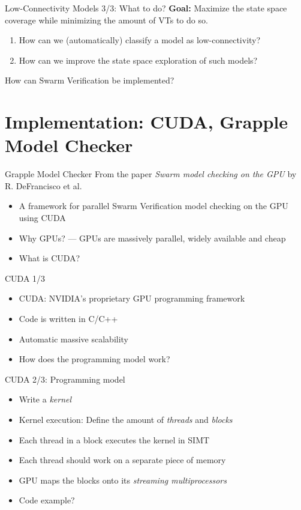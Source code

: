 \documentclass[aspectratio=169]{beamer}
\begin{document}
\begin{frame}{Low-Connectivity Models 3/3: What to do?}
    \textbf{Goal:} Maximize the state space coverage while minimizing the amount of VTs to do so.
    \begin{enumerate}
        \item How can we (automatically) classify a model as low-connectivity?
        \item How can we improve the state space exploration of such models?
    \end{enumerate}

    How can Swarm Verification be implemented?
\end{frame}

\section{Implementation: CUDA, Grapple Model Checker}

\begin{frame}{Grapple Model Checker}
    From the paper \emph{Swarm model checking on the GPU} by R. DeFrancisco et al. \cite{DeFrancisco2020.Grapple}

    \begin{itemize}
        \item A framework for parallel Swarm Verification model checking on the GPU using CUDA
        \item Why GPUs? — GPUs are massively parallel, widely available and cheap
        \item What is CUDA?
    \end{itemize}
\end{frame}

\begin{frame}{CUDA 1/3}
    \begin{itemize}
        \item CUDA: NVIDIA's proprietary GPU programming framework
        \item Code is written in C/C++
        \item Automatic massive scalability
        \item How does the programming model work?
    \end{itemize}
\end{frame}

\begin{frame}{CUDA 2/3: Programming model}
    \begin{itemize}
        \item Write a \emph{kernel}
        \item Kernel execution: Define the amount of \emph{threads} and \emph{blocks}
        \item Each thread in a block executes the kernel in SIMT
        \item Each thread should work on a separate piece of memory
        \item GPU maps the blocks onto its \emph{streaming multiprocessors}
        \item Code example?
    \end{itemize}
\end{frame}
\end{document}
